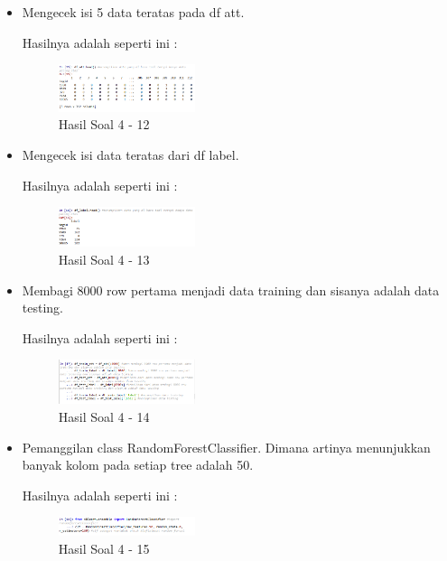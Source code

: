 \begin{enumerate}
\begin{itemize}
	\item Mengecek isi 5 data teratas pada df att.
	
	Hasilnya adalah seperti ini :

	\begin{figure}[H]
	\centering
		\includegraphics[width=4cm]{figures/1174009/tugas3/materi/12.PNG}
		\caption{Hasil Soal 4 - 12}
	\end{figure}

	\item Mengecek isi data teratas dari df label.
	
	Hasilnya adalah seperti ini :

	\begin{figure}[H]
	\centering
		\includegraphics[width=4cm]{figures/1174009/tugas3/materi/13.PNG}
		\caption{Hasil Soal 4 - 13}
	\end{figure}

	\item Membagi 8000 row pertama menjadi data training dan sisanya adalah data testing.
	
	Hasilnya adalah seperti ini :

	\begin{figure}[H]
	\centering
		\includegraphics[width=4cm]{figures/1174009/tugas3/materi/14.PNG}
		\caption{Hasil Soal 4 - 14}
	\end{figure}

	\item Pemanggilan class RandomForestClassifier. Dimana artinya menunjukkan banyak kolom pada setiap tree adalah 50.
	
	Hasilnya adalah seperti ini :

	\begin{figure}[H]
	\centering
		\includegraphics[width=4cm]{figures/1174009/tugas3/materi/15.PNG}
		\caption{Hasil Soal 4 - 15}
	\end{figure}


\end{itemize}
\end{enumerate}
